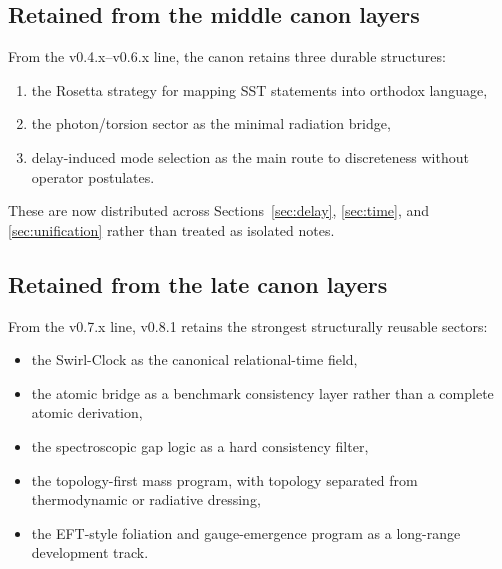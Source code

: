 \documentclass[11pt]{article}
\theoremstyle{definition}
\theoremstyle{plain}
\theoremstyle{remark}
\begin{document}
    \subsection{Retained from the middle canon layers}
        From the v0.4.x--v0.6.x line, the canon retains three durable structures:
        \begin{enumerate}
            \item the Rosetta strategy for mapping SST statements into orthodox language,
            \item the photon/torsion sector as the minimal radiation bridge,
            \item delay-induced mode selection as the main route to discreteness without operator postulates.
        \end{enumerate}
        These are now distributed across Sections~\ref{sec:delay}, \ref{sec:time}, and \ref{sec:unification} rather than treated as isolated notes.

    \subsection{Retained from the late canon layers}
        From the v0.7.x line, v0.8.1 retains the strongest structurally reusable sectors:
        \begin{itemize}
            \item the Swirl-Clock as the canonical relational-time field,
            \item the atomic bridge as a benchmark consistency layer rather than a complete atomic derivation,
            \item the spectroscopic gap logic as a hard consistency filter,
            \item the topology-first mass program, with topology separated from thermodynamic or radiative dressing,
            \item the EFT-style foliation and gauge-emergence program as a long-range development track.
        \end{itemize}
\end{document}

